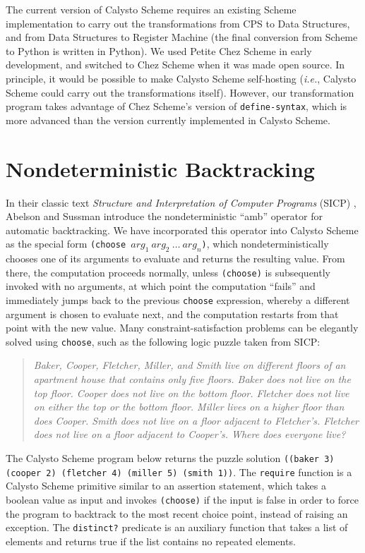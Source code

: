 \documentclass[acmsmall,screen,authorversion]{acmart}
\begin{document}
The current version of Calysto Scheme requires an existing Scheme
implementation to carry out the transformations from CPS to Data Structures,
and from Data Structures to Register Machine (the final conversion from Scheme
to Python is written in Python). We used Petite Chez Scheme in early
development, and switched to Chez Scheme when it was made open source. In
principle, it would be possible to make Calysto Scheme self-hosting
(\emph{i.e.}, Calysto Scheme could carry out the transformations
itself). However, our transformation program takes advantage of Chez Scheme's
version of \texttt{define-syntax}, which is more advanced than the version
currently implemented in Calysto Scheme.

\section{Nondeterministic Backtracking}

In their classic text \emph{Structure and Interpretation of Computer Programs}
(SICP) \cite{SICP}, Abelson and Sussman introduce the nondeterministic ``amb''
operator for automatic backtracking.  We have incorporated this operator into
Calysto Scheme as the special form
\texttt{(choose~$\mathit{arg}_1~\mathit{arg}_2~\ldots~\mathit{arg}_n$)}, which
nondeterministically chooses one of its arguments to evaluate and returns the
resulting value.  From there, the computation proceeds normally, unless
\texttt{(choose)} is subsequently invoked with no arguments, at which point the
computation ``fails'' and immediately jumps back to the previous
\texttt{choose} expression, whereby a different argument is chosen to evaluate
next, and the computation restarts from that point with the new value.  Many
constraint-satisfaction problems can be elegantly solved using \texttt{choose},
such as the following logic puzzle taken from SICP:

\begin{quote}
\emph{Baker, Cooper, Fletcher, Miller, and Smith live on different floors of an
  apartment house that contains only five floors. Baker does not live on the
  top floor. Cooper does not live on the bottom floor. Fletcher does not live
  on either the top or the bottom floor. Miller lives on a higher floor than
  does Cooper. Smith does not live on a floor adjacent to Fletcher's. Fletcher
  does not live on a floor adjacent to Cooper's. Where does everyone live?}
\end{quote}

\noindent
The Calysto Scheme program
below
returns the puzzle
solution \texttt{((baker 3) (cooper 2) (fletcher 4) (miller 5) (smith 1))}.
The \texttt{require} function is a Calysto Scheme primitive similar to an
assertion statement, which takes a boolean value as input and invokes
\texttt{(choose)} if the input is false in order to force the program to
backtrack to the most recent choice point, instead of raising an exception.
The \texttt{distinct?} predicate is an auxiliary function that takes a list of
elements and returns true if the list contains no repeated elements.
\end{document}

